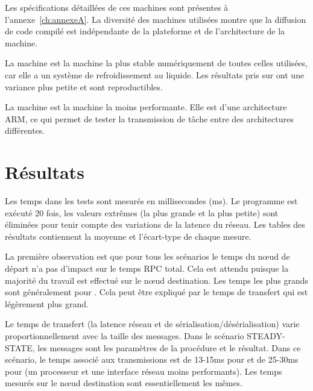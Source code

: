 Les spécifications détaillées de ces machines sont présentes à
l'annexe~\ref{ch:annexeA}. La diversité des machines utilisées montre que la
diffusion de code compilé est indépendante de la plateforme et de l'architecture de la
machine.

La machine \MMM[x86/Linux] est la machine la plus stable numériquement de toutes
celles utilisées, car elle a un système de refroidissement au liquide. Les résultats
pris sur \MMM[x86/Linux] ont une variance plus petite et sont reproductibles.

La machine  est la machine la moins performante. Elle est d'une
architecture ARM, ce qui permet de tester la transmission de tâche
entre des architectures différentes.

\section{Résultats}
Les temps dans les tests sont mesurés en millisecondes (ms).  Le programme est
exécuté 20 fois, les valeurs extrêmes (la plus grande et la plus petite) sont
éliminées pour tenir compte des variations de la latence du réseau. Les tables
des résultats contiennent la moyenne et l'écart-type de chaque mesure.


La première observation est que pour tous les scénarios le temps du nœud de
départ n'a pas d'impact sur le temps RPC total. Cela est attendu puisque la
majorité du travail est effectué sur le nœud destination. Les temps les plus
grands sont généralement pour . Cela peut être expliqué par le
temps de transfert qui est légèrement plus grand.

Le temps de transfert (la latence réseau et de sérialisation/désérialisation)
varie proportionnellement avec la taille des messages. Dans le scénario
STEADY-STATE, les messages sont les paramètres de la procédure et le résultat.
Dans ce scénario, le temps associé aux transmissions est de 13-15ms pour
\MMM[x86/macOS] et de 25-30ms pour  (un processeur et une
interface réseau moins performants). Les temps mesurés sur le nœud destination
sont essentiellement les mêmes.

